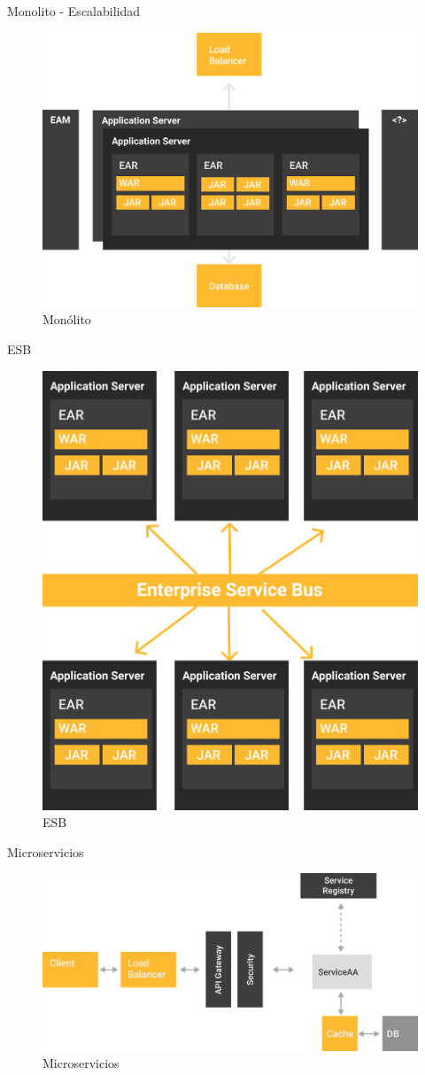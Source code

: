 \documentclass{beamer}
\begin{document}
\begin{frame}{Monolito - Escalabilidad}
\begin{figure}
	\centering
	\includegraphics[width=0.7\linewidth]{Images/monolitos}
	\caption{Monólito}
\end{figure}
\end{frame}

\begin{frame}{ESB}
\begin{figure}
	\centering
	\includegraphics[width=0.5\linewidth]{Images/esb}
	\caption{ESB}
\end{figure}
\end{frame}

\begin{frame}{Microservicios}
\begin{figure}
\centering
\includegraphics[width=\linewidth]{Images/microservicios}
\caption{Microservicios}
\end{figure}
\end{frame}
\end{document}
